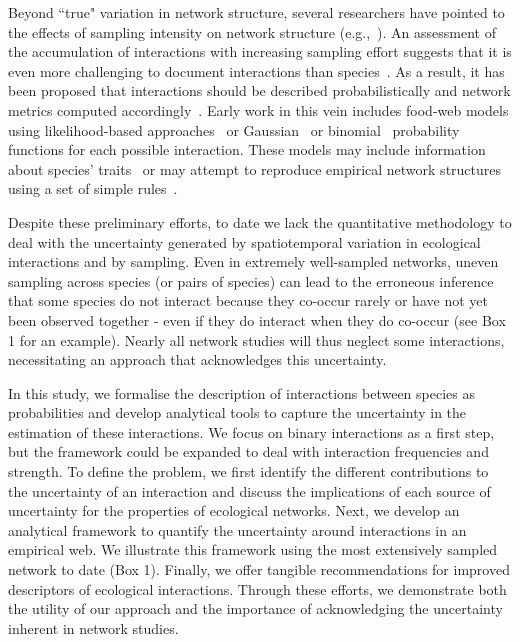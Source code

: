 \documentclass[12pt]{article}
\begin{document}
\begin{spacing}{2.0}
    Beyond ``true" variation in network structure, several researchers have pointed to the effects of sampling intensity on network structure (e.g.,~\citealp{Martinez1999,Bluthgen2006,Bluthgen2007}). An assessment of the accumulation of interactions with increasing sampling effort suggests that it is even more challenging to document interactions than species~\citep{Poisot2012}. As a result, it has been proposed that interactions should be described probabilistically and network metrics computed accordingly~\citep{Poisot2016}. Early work in this vein includes food-web models using likelihood-based approaches~\citep{Allesina2008} or Gaussian~\citep{Williams2010} or binomial~\citep{Rohr2016} probability functions for each possible interaction. These models may include information about species' traits~\citep{Rohr2016} or may attempt to reproduce empirical network structures using a set of simple rules~\citep{Allesina2008,Williams2010}.


    Despite these preliminary efforts, to date we lack the quantitative methodology to deal with the uncertainty generated by spatiotemporal variation in ecological interactions and by sampling. Even in extremely well-sampled networks, uneven sampling across species (or pairs of species) can lead to the erroneous inference that some species do not interact because they co-occur rarely or have not yet been observed together - even if they do interact when they do co-occur (see Box 1 for an example). Nearly all network studies will thus neglect some interactions, necessitating an approach that acknowledges this uncertainty.


    In this study, we formalise the description of interactions between species as probabilities and develop analytical tools to capture the uncertainty in the estimation of these interactions. We focus on binary interactions as a first step, but the framework could be expanded to deal with interaction frequencies and strength. To define the problem, we first identify the different contributions to the uncertainty of an interaction and discuss the implications of each source of uncertainty for the properties of ecological networks. Next, we develop an analytical framework to quantify the uncertainty around interactions in an empirical web. We illustrate this framework using the most extensively sampled network to date (Box 1).  Finally, we offer tangible recommendations for improved descriptors of ecological interactions. Through these efforts, we demonstrate both the utility of our approach and the importance of acknowledging the uncertainty inherent in network studies.



\end{spacing}
\end{document}
